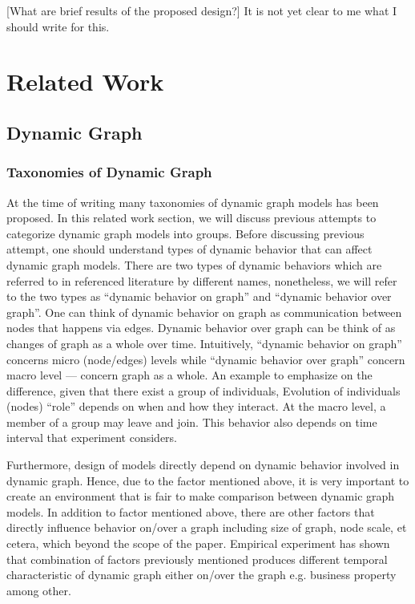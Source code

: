 \documentclass{IEEEtran}
\begin{document}
[What are brief results of the proposed design?] It is not yet clear to me what I should write for this.

\section{Related Work}
\label{sec:orgdcb7116}
\subsection{Dynamic Graph}
\label{sec:org69040e0}
\subsubsection{Taxonomies of Dynamic Graph}
\label{taxonomies of dynamic graph}
At the time of writing many taxonomies of dynamic graph models has been proposed.
In this related work section, we will discuss previous attempts to categorize dynamic graph models into groups. Before discussing previous attempt, one should understand types of dynamic behavior that can affect dynamic graph models. There are two types of dynamic behaviors which are referred to in referenced literature by different names, nonetheless, we will refer to the two types as ``dynamic behavior on graph'' and ``dynamic behavior over graph''. One can think of dynamic behavior on graph as communication between nodes that happens via edges. Dynamic  behavior over graph can be think of as changes of graph as a whole over time. Intuitively, ``dynamic behavior on graph'' concerns micro (node/edges) levels while ``dynamic behavior over graph'' concern macro level --- concern graph as a whole. An example to emphasize on the difference, given that there exist a group of individuals, Evolution of individuals (nodes) ``role'' depends on when and how they interact. At the macro level, a member of a group may leave and join. This behavior also depends on time interval that experiment considers.

Furthermore, design of models directly depend on dynamic behavior involved in dynamic graph. Hence, due to the factor mentioned above, it is very important to create an environment that is fair to make comparison between dynamic graph models. In addition to factor mentioned above, there are other factors that directly influence behavior on/over a graph including size of graph, node scale, et cetera, which beyond the scope of the paper. Empirical experiment has shown that combination of factors previously mentioned produces different temporal characteristic of dynamic graph either on/over the graph e.g. business property \cite{holme2012temporal} among other.
\end{document}
